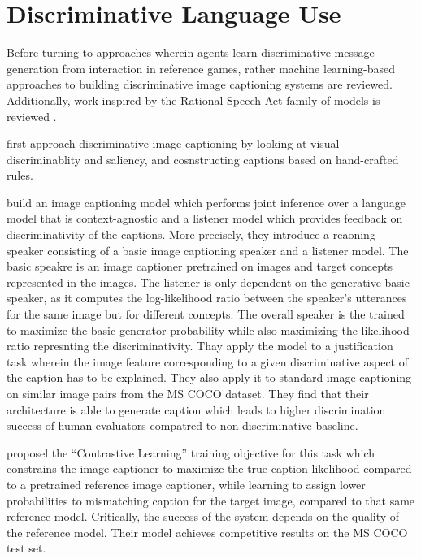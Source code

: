 
\section{Discriminative Language Use}

Before turning to approaches wherein agents learn discriminative message generation from interaction in reference games, rather machine learning-based approaches to building discriminative image captioning systems are reviewed. Additionally, work inspired by the Rational Speech Act family of models is reviewed \parencite{goodman2016pragmatic}.

\cite{sadovnik2012image} first approach discriminative image captioning by looking at visual discriminablity and saliency, and cosnstructing captions based on hand-crafted rules.

\cite{vedantam2017context} build an image captioning model which performs joint inference over a language model that is context-agnostic and a listener model which provides feedback on discriminativity of the captions. More precisely, they introduce a reaoning speaker consisting of a basic image captioning speaker and a listener model. The basic speakre is an image captioner pretrained on images and target concepts represented in the images. The listener is only dependent on the generative basic speaker, as it computes the log-likelihood ratio between the speaker's utterances for the same image but for different concepts. The overall speaker is the trained to maximize the basic generator probability while also maximizing the likelihood ratio represnting the discriminativity.
Thay apply the model to a justification task wherein the image feature corresponding to a given discriminative aspect of the caption has to be explained. They also apply it to standard image captioning on similar image pairs from the MS COCO dataset. They find that their architecture is able to generate caption which leads to higher discrimination success of human evaluators compatred to non-discriminative baseline.

\cite{dai2017contrastive} proposel the ``Contrastive Learning'' training objective for this task which constrains the image captioner to maximize the true caption likelihood compared to a pretrained reference image captioner, while learning to assign lower probabilities to mismatching caption for the target image, compared to that same reference model. Critically, the success of the system depends on the quality of the reference model. Their model achieves competitive results on the MS COCO test set.

